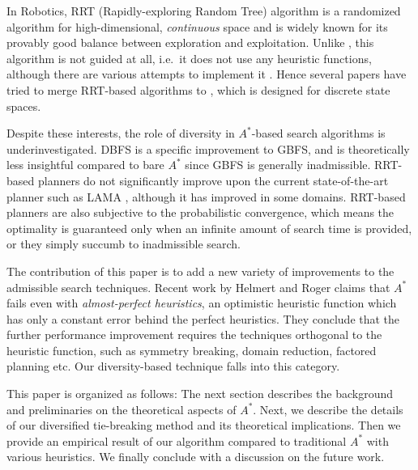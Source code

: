 In Robotics, RRT (Rapidly-exploring Random Tree) algorithm \cite{lavalle2001randomized} is a \sota randomized algorithm for high-dimensional, \emph{continuous} space and is widely known for its provably good balance between exploration and exploitation. Unlike \astar, this algorithm is not guided at all, i.e.\ it does not use any heuristic functions, although there are various attempts to implement it \cite{urmson2003approaches,urmson2003approaches}. Hence several papers \cite{alcazar2011adapting,burfoot2006rrt,likhachev2008r} have tried to merge RRT-based algorithms to \astar, which is designed for discrete state spaces.

Despite these interests, the role of diversity in \(A^*\)-based search
algorithms is underinvestigated.
DBFS is a specific improvement to GBFS, and is theoretically less insightful compared
to bare \(A^*\) since GBFS is generally inadmissible.
RRT-based planners do not significantly improve upon the current
state-of-the-art planner such as LAMA \cite{alcazar2011adapting}, although it
has improved in some domains. RRT-based planners are also subjective to
the probabilistic convergence, which means the optimality is guaranteed
only when an infinite amount of search time is provided, or they simply succumb to
inadmissible search.


The contribution of this paper is to add a new variety of improvements to the admissible search techniques.
Recent work by Helmert and Roger  claims that \(A^*\) fails even with \emph{almost-perfect heuristics}, an optimistic heuristic function which has only a constant error
behind the perfect heuristics.
They conclude that the further performance improvement requires the
techniques orthogonal to the heuristic function, such as symmetry breaking,
domain reduction, factored planning etc.
Our diversity-based technique falls into this category.

This paper is organized as follows: The next section describes the background and preliminaries on the theoretical aspects of \(A^*\). Next, we describe the details of our diversified tie-breaking method and its theoretical implications.  Then we provide an empirical result of our algorithm compared to traditional \(A^*\) with various heuristics. We finally conclude with a discussion on the future work.

